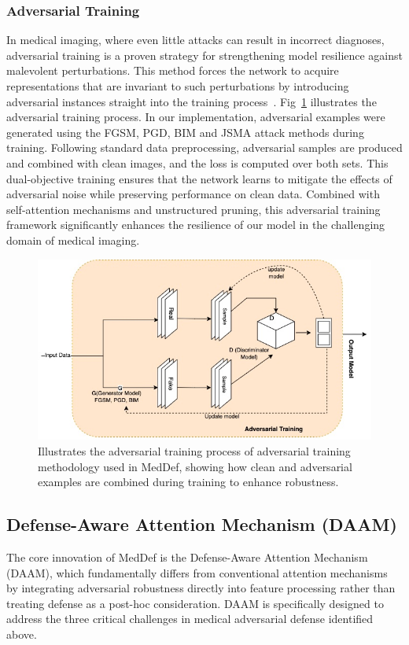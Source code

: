 \documentclass[preprint,12pt]{elsarticle}
\begin{document}
\subsubsection{Adversarial Training}
In medical imaging, where even little attacks can result in incorrect diagnoses, adversarial training is a proven strategy for strengthening model resilience against malevolent perturbations. This method forces the network to acquire representations that are invariant to such perturbations by introducing adversarial instances straight into the training process~\cite{Zeng22}. Fig~\ref{fig:adversarial_training} illustrates the adversarial training process. In our implementation, adversarial examples were generated using the FGSM, PGD, BIM and JSMA attack methods during training. Following standard data preprocessing, adversarial samples are produced and combined with clean images, and the loss is computed over both sets. This dual-objective training ensures that the network learns to mitigate the effects of adversarial noise while preserving performance on clean data. Combined with self-attention mechanisms and unstructured pruning, this adversarial training framework significantly enhances the resilience of our model in the challenging domain of medical imaging.

\begin{figure}[!t]
\centerline{\includegraphics[width=\columnwidth]{fig/fig3.jpg}}
\caption{Illustrates the adversarial training process of adversarial training methodology used in MedDef, showing how clean and adversarial examples are combined during training to enhance robustness.}
\label{fig:adversarial_training}
\end{figure}

\subsection{Defense-Aware Attention Mechanism (DAAM)}
The core innovation of MedDef is the Defense-Aware Attention Mechanism (DAAM), which fundamentally differs from conventional attention mechanisms by integrating adversarial robustness directly into feature processing rather than treating defense as a post-hoc consideration. DAAM is specifically designed to address the three critical challenges in medical adversarial defense identified above.
\end{document}
